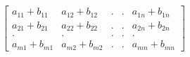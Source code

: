 \documentclass[preview]{standalone}
\begin{document}
\begin{align*}
\begin{bmatrix} {a}_{11} + {b}_{11} & {a}_{12} + {b}_{12} & . & . & {a}_{1n} + {b}_{1n}\\ {a}_{21} + {b}_{21} & {a}_{22} + {b}_{22}  & . & . & {a}_{2n} + {b}_{2n} \\ . & . & . & . & . \\ {a}_{m1}+{b}_{m1} & {a}_{m2}+{b}_{m2} & . & . & {a}_{mn}+{b}_{mn}\end{bmatrix}
\end{align*}
\end{document}
